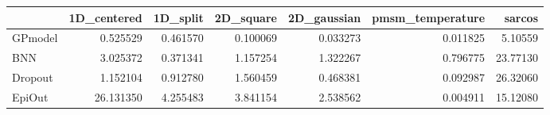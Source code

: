 \begin{tabular}{lrrrrrr}
\toprule
{} &  1D\_centered &  1D\_split &  2D\_square &  2D\_gaussian &  pmsm\_temperature &    sarcos \\
\midrule
GPmodel &     0.525529 &  0.461570 &   0.100069 &     0.033273 &          0.011825 &   5.10559 \\
BNN     &     3.025372 &  0.371341 &   1.157254 &     1.322267 &          0.796775 &  23.77130 \\
Dropout &     1.152104 &  0.912780 &   1.560459 &     0.468381 &          0.092987 &  26.32060 \\
EpiOut  &    26.131350 &  4.255483 &   3.841154 &     2.538562 &          0.004911 &  15.12080 \\
\bottomrule
\end{tabular}
